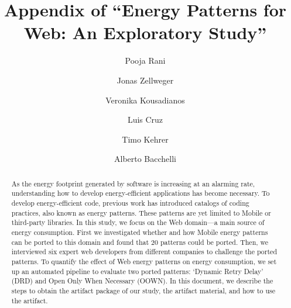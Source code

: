 \documentclass[sigconf,review]{acmart}
\begin{document}
\title{Appendix of ``Energy Patterns for Web: An Exploratory Study''}

\author{Pooja Rani}

\author{Jonas Zellweger}

\author{Veronika Kousadianos}
 
 
 \author{Luis Cruz}

\author{Timo Kehrer}
 
\author{Alberto Bacchelli}

\begin{abstract}
As the energy footprint generated by software is increasing at an alarming rate, understanding how to develop energy-efficient applications has become necessary.
To develop energy-efficient code, previous work has introduced catalogs of coding practices, also known as energy patterns.
These patterns are yet limited to Mobile or third-party libraries.
In this study, we focus on the Web domain---a main source of energy consumption.
First we investigated whether and how Mobile energy patterns can be ported to this domain and found that 20 patterns could be ported.
Then, we interviewed six expert web developers from different companies to challenge the ported patterns.
To quantify the effect of Web energy patterns on energy consumption, we set up an automated pipeline to evaluate two ported patterns: `Dynamic Retry Delay' (DRD) and  Open Only When Necessary (OOWN). 
In this document, we describe the steps to obtain the artifact package of our study, the artifact material, and how to use the artifact.
\end{abstract}

\maketitle




\end{document}
